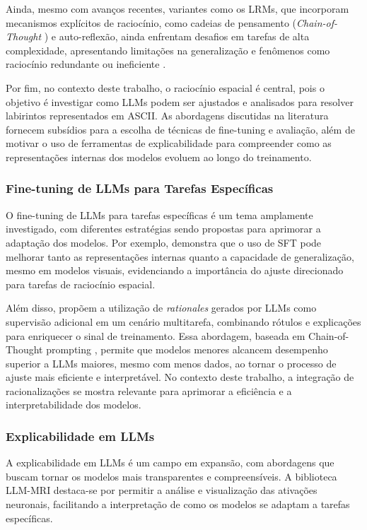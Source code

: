 Ainda, mesmo com avanços recentes, variantes como os LRMs, que incorporam mecanismos explícitos de raciocínio, como cadeias de pensamento (\textit{Chain-of-Thought} \cite{wei2023chainofthought}) e auto-reflexão, ainda enfrentam desafios em tarefas de alta complexidade, apresentando limitações na generalização e fenômenos como raciocínio redundante ou ineficiente \cite{shojaee2025illusionthinking}.

Por fim, no contexto deste trabalho, o raciocínio espacial é central, pois o objetivo é investigar como LLMs podem ser ajustados e analisados para resolver labirintos representados em ASCII. As abordagens discutidas na literatura fornecem subsídios para a escolha de técnicas de fine-tuning e avaliação, além de motivar o uso de ferramentas de explicabilidade para compreender como as representações internas dos modelos evoluem ao longo do treinamento.

\subsubsection{Fine-tuning de LLMs para Tarefas Específicas}

O fine-tuning de LLMs para tarefas específicas é um tema amplamente investigado, com diferentes estratégias sendo propostas para aprimorar a adaptação dos modelos. Por exemplo, \cite{jiang2024supervised} demonstra que o uso de SFT pode melhorar tanto as representações internas quanto a capacidade de generalização, mesmo em modelos visuais, evidenciando a importância do ajuste direcionado para tarefas de raciocínio espacial.

Além disso, \cite{hsieh2023distillingstepbystep} propõem a utilização de \textit{rationales} gerados por LLMs como supervisão adicional em um cenário multitarefa, combinando rótulos e explicações para enriquecer o sinal de treinamento. Essa abordagem, baseada em Chain-of-Thought prompting \cite{wei2023chainofthought}, permite que modelos menores alcancem desempenho superior a LLMs maiores, mesmo com menos dados, ao tornar o processo de ajuste mais eficiente e interpretável. No contexto deste trabalho, a integração de racionalizações se mostra relevante para aprimorar a eficiência e a interpretabilidade dos modelos.

\subsubsection{Explicabilidade em LLMs}

A explicabilidade em LLMs é um campo em expansão, com abordagens que buscam tornar os modelos mais transparentes e compreensíveis. A biblioteca LLM-MRI \cite{costa2024llmmri} destaca-se por permitir a análise e visualização das ativações neuronais, facilitando a interpretação de como os modelos se adaptam a tarefas específicas.

